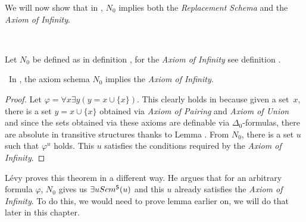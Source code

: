 We will now show that in , $N_0$ implies both the \emph{Replacement Schema} and the \emph{Axiom of Infinity}.

\

Let $N_0$ be defined as in definition , for the \emph{Axiom of Infinity} see definition .
\begin{theorem}\label{theorem:n0_implies_infinity}\
In , the axiom schema $N_0$ implies the \emph{Axiom of Infinity}.
\end{theorem}

\begin{proof} %
Let $\varphi = \forall x \exists y (y = x \cup \{x\})$. 
This clearly holds in  because given a set~$x$, there is a set $y = x \cup \{x\}$ obtained via \emph{Axiom of Pairing} and \emph{Axiom of Union} and since the sets obtained via these axioms are definable via $\Delta_0$-formulas, there are absolute in transitive structures thanks to Lemma . %
From $N_0$, there is a set $u$ such that $\varphi^{u}$ holds. %
 This $u$ satisfies the conditions required by the \emph{Axiom of Infinity}.
\end{proof}

Lévy proves this theorem in a different way. He argues that for an arbitrary formula $\varphi$, $N_0$ gives us $\exists u Scm^{\sf{S}}(u)$ and this $u$ already satisfies the \emph{Axiom of Infinity}. 
To do this, we would need to prove lemma \bref{lemma:scm_s_is_limit} earlier on, we will do that later in this chapter.

\

